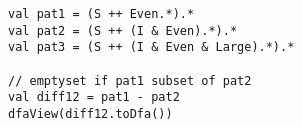 \begin{lstlisting}[style=reclojureScala]
val pat1 = (S ++ Even.*).*
val pat2 = (S ++ (I & Even).*).*
val pat3 = (S ++ (I & Even & Large).*).*

// emptyset if pat1 subset of pat2
val diff12 = pat1 - pat2
dfaView(diff12.toDfa())
\end{lstlisting}
